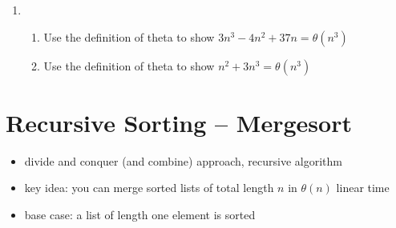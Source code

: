 \documentclass[12pt]{report}
\begin{document}
\begin{enumerate}[label=,start=3]
    \item \begin{enumerate}[label=\arabic{enumi}\alph*.]
        \item Use the definition of theta to show $3n^{3}-4n^{2}+37n=\theta(n^{3})$ 
        \item Use the definition of theta to show $n^{2}+3n^{3}=\theta(n^{3})$ 
    \end{enumerate}
\end{enumerate}

\section{Recursive Sorting -- Mergesort}
\begin{itemize}
	\item divide and conquer (and combine) approach, recursive algorithm
	\item key idea: you can merge sorted lists of total length $n$ in $\theta(n)$ linear time
	\item base case: a list of length one element is sorted
\end{itemize}
\end{document}
